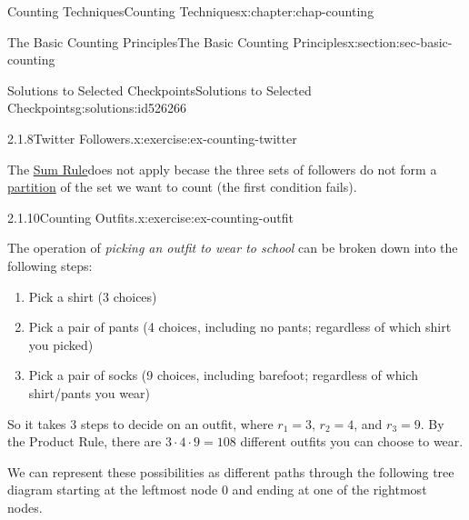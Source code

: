 \documentclass[oneside,10pt,]{book}
\numberwithin{equation}{section}
\begin{document}
\begin{chapterptx}{Counting Techniques}{}{Counting Techniques}{}{}{x:chapter:chap-counting}
\begin{sectionptx}{The Basic Counting Principles}{}{The Basic Counting Principles}{}{}{x:section:sec-basic-counting}
\begin{solutions-subsection-numberless}{Solutions to Selected Checkpoints}{}{Solutions to Selected Checkpoints}{}{}{g:solutions:id526266}
\begin{inlinesolution}{2.1.8}{Twitter Followers.}{x:exercise:ex-counting-twitter}
\par
The \hyperref[x:principle:prin-sum-rule]{Sum Rule}does not apply becase the three sets of followers do not form a \hyperref[x:definition:def-partition]{partition} of the set we want to count (the first condition fails).%
\end{inlinesolution}%
\begin{inlinesolution}{2.1.10}{Counting Outfits.}{x:exercise:ex-counting-outfit}%
\par\smallskip%
\noindent\hypertarget{g:solution:id525989-main}{}The operation of \emph{picking an outfit to wear to school} can be broken down into the following steps:%
\begin{enumerate}
\item{}Pick a shirt (3 choices)%
\item{}Pick a pair of pants (4 choices, including no pants; regardless of which shirt you picked)%
\item{}Pick a pair of socks (9 choices, including barefoot; regardless of which shirt\slash{}pants you wear)%
\end{enumerate}
So it takes 3 steps to decide on an outfit, where \(r_1 = 3\), \(r_2 = 4\), and \(r_3 = 9\). By the Product Rule, there are \(3 \cdot 4 \cdot 9 = 108\) different outfits you can choose to wear.%
\par
We can represent these possibilities as different paths through the following tree diagram starting at the leftmost node \(0\) and ending at one of the rightmost nodes.%
\begin{sidebyside}{1}{0.15}{0.15}{0}%
\begin{sbspanel}{0.7}%
\end{sbspanel}
\end{sidebyside}
\end{inlinesolution}
\end{solutions-subsection-numberless}
\end{sectionptx}
\end{chapterptx}
\end{document}
